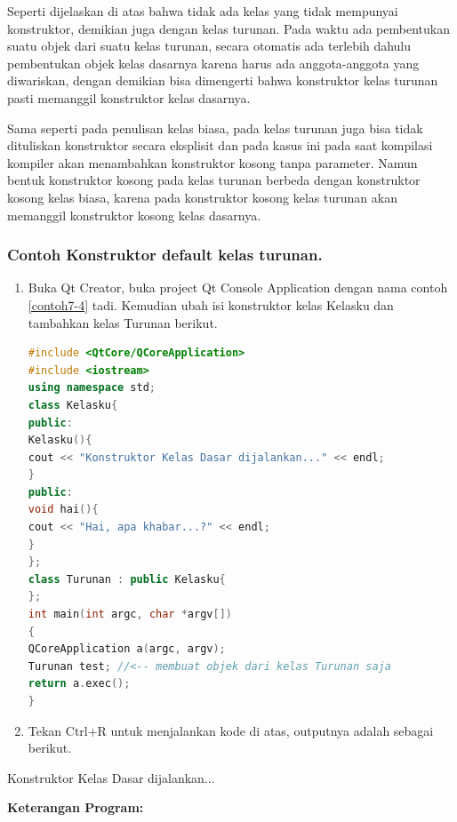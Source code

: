 Seperti dijelaskan di atas bahwa tidak ada kelas yang tidak mempunyai
konstruktor, demikian juga dengan kelas turunan. Pada waktu ada
pembentukan suatu objek dari suatu kelas turunan, secara otomatis ada
terlebih dahulu pembentukan objek kelas dasarnya karena harus ada
anggota-anggota yang diwariskan, dengan demikian bisa dimengerti bahwa
konstruktor kelas turunan pasti memanggil konstruktor kelas dasarnya.

Sama seperti pada penulisan kelas biasa, pada kelas turunan juga bisa
tidak dituliskan konstruktor secara eksplisit dan pada kasus ini pada
saat kompilasi kompiler akan menambahkan konstruktor kosong tanpa
parameter. Namun bentuk konstruktor kosong pada kelas turunan berbeda
dengan konstruktor kosong kelas biasa, karena pada konstruktor kosong
kelas turunan akan memanggil konstruktor kosong kelas dasarnya.

\subsubsection*{Contoh Konstruktor default kelas turunan.}

\begin{enumerate}

\item
  Buka Qt Creator, buka project Qt Console Application dengan nama
  contoh \ref{contoh7-4} tadi. Kemudian ubah isi konstruktor kelas Kelasku dan
  tambahkan kelas Turunan berikut.

\begin{lstlisting}[language=c++, caption=Konstruktor default kelas turunan, label=contoh7-4]
#include <QtCore/QCoreApplication>
#include <iostream>
using namespace std;
class Kelasku{
public:
Kelasku(){
cout << "Konstruktor Kelas Dasar dijalankan..." << endl;
}
public:
void hai(){
cout << "Hai, apa khabar...?" << endl;
}
};
class Turunan : public Kelasku{
};
int main(int argc, char *argv[])
{
QCoreApplication a(argc, argv);
Turunan test; //<-- membuat objek dari kelas Turunan saja
return a.exec();
}
\end{lstlisting}
\item
  Tekan Ctrl+R untuk menjalankan kode di atas, outputnya adalah sebagai
  berikut.
\end{enumerate}

\begin{lcverbatim}
Konstruktor Kelas Dasar dijalankan...
\end{lcverbatim}


\textbf{Keterangan Program:}

